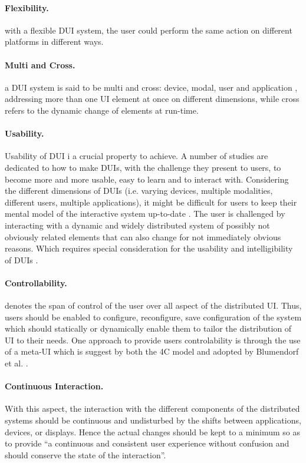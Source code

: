 \paragraph{Flexibility.} with a flexible DUI system, the
user could perform the same action on different platforms in different
ways.\cite{lopez2011formal}
\paragraph{Multi and Cross.} a DUI system is said to be multi and cross:
device, modal, user and application  \cite{blumendorf2011distributed},
addressing more than one UI element at once on different dimensions, while cross
refers to the dynamic change of elements at run-time.
\paragraph{Usability.} Usability of DUI i a crucial property to achieve. A
number of studies are dedicated to how to make DUIs, with the challenge they
present to users, to become more and more usable, easy to learn and to interact
with. Considering the different dimensions of DUIs (i.e.
varying devices, multiple modalities, different users, multiple applications),
it might be difficult for users to keep their mental model of the interactive system up-to-date \cite{blumendorf2011distributed}. The user is challenged by
interacting with a dynamic and widely distributed system of possibly not
obviously related elements that can also change for not immediately obvious
reasons. Which requires special consideration for the usability and
intelligibility of DUIs \cite{blumendorf2011distributed}.
\paragraph{Controllability.} denotes the span of control of the user over all
aspect of the distributed UI. Thus, users should be enabled to configure,
reconfigure, save configuration of the system which should statically or
dynamically enable them to tailor the distribution of UI to their needs. One
approach to provide users controlability is through the use of a meta-UI which
is suggest by both the 4C model \cite{demeure20084c} and adopted by Blumendorf
et al. \cite{blumendorf2011distributed}.
\paragraph{Continuous Interaction.} With this aspect, the interaction with the
different components of the distributed systems should be continuous and
undisturbed by the shifts between applications, devices, or displays. Hence the
actual changes should be kept to a minimum so as to provide ``a continuous and consistent
user experience without confusion and should conserve the state of the
interaction''\cite{blumendorf2011distributed}.
